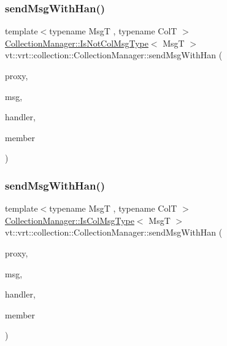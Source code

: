 \subsubsection{\texorpdfstring{send\+Msg\+With\+Han()}{sendMsgWithHan()}\hspace{0.1cm}{\footnotesize\ttfamily [1/2]}}
{\footnotesize\ttfamily template$<$typename MsgT , typename ColT $>$ \\
\hyperlink{structvt_1_1vrt_1_1collection_1_1_collection_manager_ae376deeefd4f89a0b1c93849977715d9}{Collection\+Manager\+::\+Is\+Not\+Col\+Msg\+Type}$<$ MsgT $>$ vt\+::vrt\+::collection\+::\+Collection\+Manager\+::send\+Msg\+With\+Han (\begin{DoxyParamCaption}\item[{\hyperlink{namespacevt_1_1vrt_a620a5c8c59d13e513f690c74b4af516f}{Virtual\+Elm\+Proxy\+Type}$<$ ColT $>$ const \&}]{proxy,  }\item[{MsgT $\ast$}]{msg,  }\item[{\hyperlink{namespacevt_af64846b57dfcaf104da3ef6967917573}{Handler\+Type} const \&}]{handler,  }\item[{bool const}]{member }\end{DoxyParamCaption})}

\mbox{\label{structvt_1_1vrt_1_1collection_1_1_collection_manager_a7be0a9b42876d4eb28b26eccb37351a3}} 
\subsubsection{\texorpdfstring{send\+Msg\+With\+Han()}{sendMsgWithHan()}\hspace{0.1cm}{\footnotesize\ttfamily [2/2]}}
{\footnotesize\ttfamily template$<$typename MsgT , typename ColT $>$ \\
\hyperlink{structvt_1_1vrt_1_1collection_1_1_collection_manager_a21c21612c806016788057aeab142af20}{Collection\+Manager\+::\+Is\+Col\+Msg\+Type}$<$ MsgT $>$ vt\+::vrt\+::collection\+::\+Collection\+Manager\+::send\+Msg\+With\+Han (\begin{DoxyParamCaption}\item[{\hyperlink{namespacevt_1_1vrt_a620a5c8c59d13e513f690c74b4af516f}{Virtual\+Elm\+Proxy\+Type}$<$ ColT $>$ const \&}]{proxy,  }\item[{MsgT $\ast$}]{msg,  }\item[{\hyperlink{namespacevt_af64846b57dfcaf104da3ef6967917573}{Handler\+Type} const \&}]{handler,  }\item[{bool const}]{member }\end{DoxyParamCaption})}


